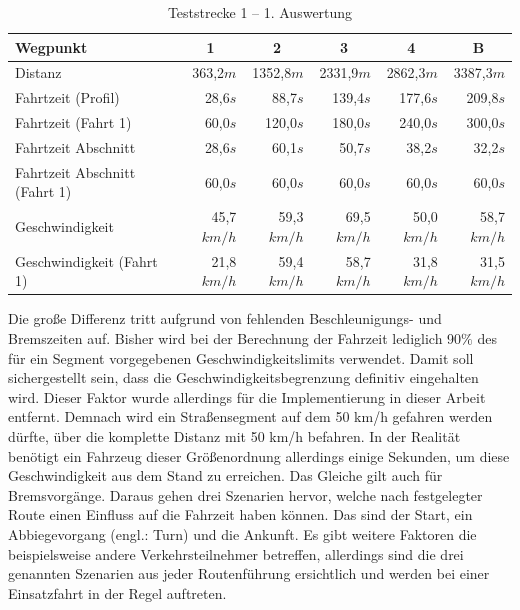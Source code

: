 \begin{table}[htb]
\centering
\small
\caption{Teststrecke 1 -- 1. Auswertung}
\label{tab:driveinit}
\begin{tabular}{|l|r|r|r|r|r|}
\hline
Wegpunkt                               & \multicolumn{1}{c|}{1} & \multicolumn{1}{c|}{2} & \multicolumn{1}{c|}{3} & \multicolumn{1}{c|}{4} & \multicolumn{1}{c|}{B}      \\ \hline
Distanz                                & 363,2$m$                & 1352,8$m$               & 2331,9$m$               & 2862,3$m$               & 3387,3$m$               \\ \hline
Fahrtzeit (Profil)                     & 28,6$s$                 & 88,7$s$                 & 139,4$s$                & 177,6$s$                & 209,8$s$                \\ \hline
Fahrtzeit (Fahrt 1)                  & 60,0$s$                 & 120,0$s$                & 180,0$s$                & 240,0$s$                & 300,0$s$                \\ \hline
Fahrtzeit Abschnitt                    & 28,6$s$                 & 60,1$s$                 & 50,7$s$                 & 38,2$s$                 & 32,2$s$                 \\ \hline
Fahrtzeit Abschnitt (Fahrt 1)        & 60,0$s$                 & 60,0$s$                 & 60,0$s$                 & 60,0$s$                 & 60,0$s$                 \\ \hline
Geschwindigkeit                        & 45,7$km/h$              & 59,3$km/h$              & 69,5$km/h$              & 50,0$km/h$              & 58,7$km/h$              \\ \hline
Geschwindigkeit (Fahrt 1)            & 21,8$km/h$              & 59,4$km/h$              & 58,7$km/h$              & 31,8$km/h$              & 31,5$km/h$              \\ \hline
\end{tabular}
\end{table}

Die große Differenz tritt aufgrund von fehlenden Beschleunigungs- und Bremszeiten auf.
Bisher wird bei der Berechnung der Fahrzeit lediglich 90$\%$ des für ein Segment vorgegebenen Geschwindigkeitslimits verwendet.
Damit soll sichergestellt sein, dass die Geschwindigkeitsbegrenzung definitiv eingehalten wird.
Dieser Faktor wurde allerdings für die Implementierung in dieser Arbeit entfernt.
Demnach wird ein Straßensegment auf dem 50 km/h gefahren werden dürfte, über die komplette Distanz mit 50 km/h befahren.
In der Realität benötigt ein Fahrzeug dieser Größenordnung allerdings einige Sekunden, um diese Geschwindigkeit aus dem Stand zu erreichen.
Das Gleiche gilt auch für Bremsvorgänge.
Daraus gehen drei Szenarien hervor, welche nach festgelegter Route einen Einfluss auf die Fahrzeit haben können.
Das sind der Start, ein Abbiegevorgang (engl.: Turn) und die Ankunft.
Es gibt weitere Faktoren die beispielsweise andere Verkehrsteilnehmer betreffen, allerdings sind die drei genannten Szenarien aus jeder Routenführung ersichtlich und werden bei einer Einsatzfahrt in der Regel auftreten.

